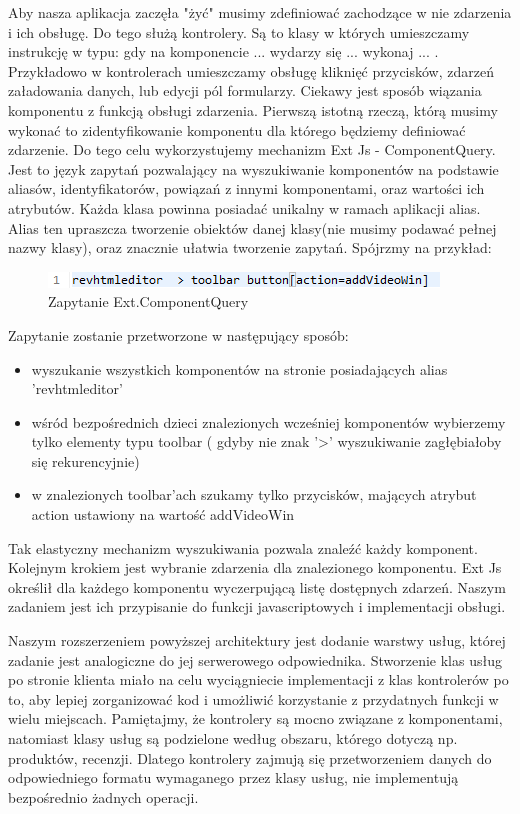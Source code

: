 Aby nasza aplikacja zaczęła "żyć" musimy zdefiniować zachodzące w nie zdarzenia i ich obsługę. Do tego służą kontrolery. Są to klasy w których umieszczamy instrukcję w typu: gdy na komponencie ... wydarzy się ... wykonaj ... . Przykładowo w kontrolerach umieszczamy obsługę kliknięć przycisków, zdarzeń załadowania danych, lub edycji pól formularzy. Ciekawy jest sposób wiązania komponentu z funkcją obsługi zdarzenia. Pierwszą istotną rzeczą, którą musimy wykonać to zidentyfikowanie komponentu dla którego będziemy definiować zdarzenie. Do tego celu wykorzystujemy mechanizm Ext Js - ComponentQuery. Jest to język zapytań pozwalający na wyszukiwanie komponentów na podstawie aliasów, identyfikatorów, powiązań z innymi komponentami, oraz wartości ich atrybutów. Każda klasa powinna posiadać unikalny w ramach aplikacji alias. Alias ten upraszcza tworzenie obiektów danej klasy(nie musimy podawać pełnej nazwy klasy), oraz znacznie ułatwia tworzenie zapytań. Spójrzmy na przykład: 

\begin{figure}[H]
	\centering
	\includegraphics[width=\textwidth]{images/cmp_query.png}
	\caption{Zapytanie Ext.ComponentQuery}
\end{figure}

Zapytanie zostanie przetworzone w następujący sposób:

\begin{itemize}
\item wyszukanie wszystkich komponentów na stronie posiadających alias 'revhtmleditor'
\item wśród bezpośrednich dzieci znalezionych wcześniej komponentów wybierzemy tylko elementy typu toolbar ( gdyby nie znak '>' wyszukiwanie zagłębiałoby się rekurencyjnie)
\item w znalezionych toolbar'ach szukamy tylko przycisków, mających atrybut action ustawiony na wartość addVideoWin
\end{itemize}

Tak elastyczny mechanizm wyszukiwania pozwala znaleźć każdy komponent.
Kolejnym krokiem jest wybranie zdarzenia dla znalezionego komponentu. Ext Js określił dla każdego komponentu wyczerpującą listę dostępnych zdarzeń. Naszym zadaniem jest ich przypisanie do funkcji javascriptowych i implementacji obsługi.

Naszym rozszerzeniem powyższej architektury jest dodanie warstwy usług, której zadanie jest analogiczne do jej serwerowego odpowiednika. Stworzenie klas usług po stronie klienta miało na celu wyciągniecie implementacji z klas kontrolerów po to, aby lepiej zorganizować kod i umożliwić korzystanie z przydatnych funkcji w wielu miejscach. Pamiętajmy, że kontrolery są mocno związane z komponentami, natomiast klasy usług są podzielone według obszaru, którego dotyczą np. produktów, recenzji. Dlatego kontrolery zajmują się przetworzeniem danych do odpowiedniego formatu wymaganego przez klasy usług, nie implementują bezpośrednio żadnych operacji.




